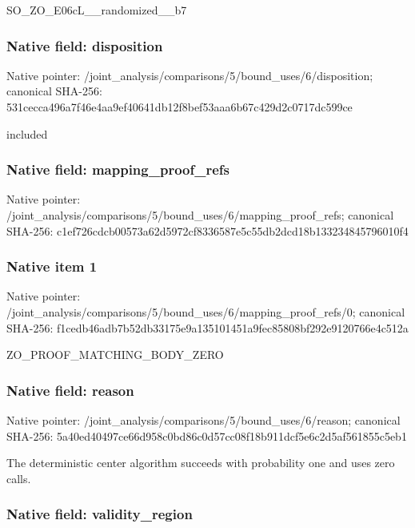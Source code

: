 \documentclass[10pt,a4paper]{article}
\begin{document}
SO\_ZO\_E06cL\_\_randomized\_\_b7


\subsubsection{Native field: disposition}


Native pointer: /joint\_analysis/comparis\allowbreak{}ons/5/bound\_uses/6/dispo\allowbreak{}sition; canonical SHA-256: 531cecca496a7f46e4aa9ef4\allowbreak{}0641db12f8bef53aaa6b67c4\allowbreak{}29d2c0717dc599ce


included


\subsubsection{Native field: mapping\_proof\_refs}


Native pointer: /joint\_analysis/comparis\allowbreak{}ons/5/bound\_uses/6/mappi\allowbreak{}ng\_proof\_refs; canonical SHA-256: c1ef726cdcb00573a62d5972\allowbreak{}cf8336587e5c55db2dcd18b1\allowbreak{}33234845796010f4



\subsubsection{Native item 1}


Native pointer: /joint\_analysis/comparis\allowbreak{}ons/5/bound\_uses/6/mappi\allowbreak{}ng\_proof\_refs/0; canonical SHA-256: f1cedb46adb7b52db33175e9\allowbreak{}a135101451a9fec85808bf29\allowbreak{}2e9120766e4c512a


ZO\_PROOF\_MATCHING\_BODY\_ZERO


\subsubsection{Native field: reason}


Native pointer: /joint\_analysis/comparis\allowbreak{}ons/5/bound\_uses/6/reaso\allowbreak{}n; canonical SHA-256: 5a40ed40497ce66d958c0bd8\allowbreak{}6c0d57cc08f18b911dcf5e6c\allowbreak{}2d5af561855c5eb1


The deterministic center algorithm succeeds with probability one and uses zero calls.


\subsubsection{Native field: validity\_region}
\end{document}
